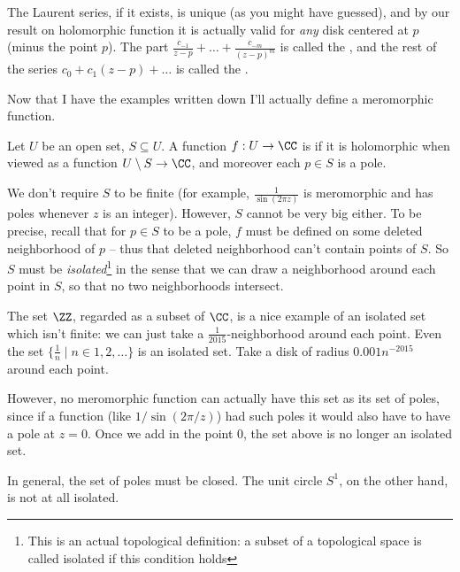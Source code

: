 The Laurent series, if it exists, is unique (as you might have guessed),
and by our result on holomorphic function it is actually valid for \emph{any}
disk centered at $p$ (minus the point $p$).
The part $\frac{c_{-1}}{z-p} + \dots + \frac{c_{-m}}{(z-p)^m}$ is called the ,
and the rest of the series $c_0 + c_1(z-p) + \dots$ is called the .

Now that I have the examples written down I'll actually define a meromorphic function.
\begin{definition}
	Let $U$ be an open set, $S \subseteq U$.
	A function $f : U \to \CC$ is 
	if it is holomorphic when viewed as a function $U \setminus S \to \CC$,
	and moreover each $p \in S$ is a pole.
\end{definition}
We don't require $S$ to be finite (for example, $\frac{1}{\sin(2\pi z)}$ is meromorphic
and has poles whenever $z$ is an integer).
However, $S$ cannot be very big either.
To be precise, recall that for $p \in S$ to be a pole, $f$ must be defined on some
deleted neighborhood of $p$ -- thus that deleted neighborhood can't contain points of $S$.
So $S$ must be \emph{isolated}\footnote{This is an actual topological definition: a subset
of a topological space is called isolated if this condition holds}
in the sense that we can draw a neighborhood around
each point in $S$, so that no two neighborhoods intersect.


\begin{example}
	\listhack
	\begin{enumerate}[(a)]
		\ii The set $\ZZ$, regarded as a subset of $\CC$, is a nice example of an isolated set
		which isn't finite: we can just take a $\frac{1}{2015}$-neighborhood around each point.
		\ii Even the set $\{\frac 1n \mid n \in 1,2,\dots \}$ is an isolated set.
		Take a disk of radius $0.001n^{-2015}$ around each point.
		
		However, no meromorphic function can actually have this set as its set of poles, since
		if a function (like $1/\sin(2\pi/z)$) had such poles it would also have to have a pole at $z=0$.
		Once we add in the point $0$, the set above is no longer an isolated set.

		In general, the set of poles must be closed.
		\ii The unit circle $S^1$, on the other hand, is not at all isolated.
	\end{enumerate}
\end{example}


